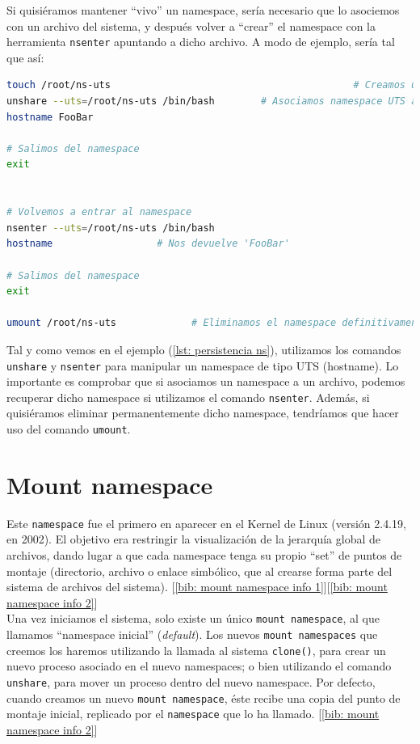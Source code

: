 \documentclass[a4paper, oneside, 12pt]{book}
\begin{document}
	\noindent Si quisiéramos mantener ``vivo'' un namespace, sería necesario que lo asociemos con un archivo del sistema, y después volver a ``crear'' el namespace con la herramienta \texttt{nsenter} apuntando a dicho archivo. A modo de ejemplo, sería tal que así:
	
	\begin{lstlisting}[language=Bash, label=lst: persistencia ns, caption=Ejemplo de un persistencia namespace]
touch /root/ns-uts											# Creamos un archivo
unshare --uts=/root/ns-uts /bin/bash		# Asociamos namespace UTS al archivo
hostname FooBar

# Salimos del namespace
exit
		
		
# Volvemos a entrar al namespace
nsenter --uts=/root/ns-uts /bin/bash
hostname                  # Nos devuelve 'FooBar'
		
# Salimos del namespace
exit
		
umount /root/ns-uts 			# Eliminamos el namespace definitivamente
	\end{lstlisting}
	
	\vspace{10px}
	
	\noindent Tal y como vemos en el ejemplo (\ref{lst: persistencia ns}), utilizamos los comandos \texttt{unshare} y \texttt{nsenter} para manipular un namespace de tipo UTS (hostname). Lo importante es comprobar que si asociamos un namespace a un archivo, podemos recuperar dicho namespace si utilizamos el comando \texttt{nsenter}. Además, si quisiéramos eliminar permanentemente dicho namespace, tendríamos que hacer uso del comando \texttt{umount}.
	
	\pagebreak
	
	\section{Mount namespace}
	\noindent Este \texttt{namespace} fue el primero en aparecer en el Kernel de Linux (versión 2.4.19, en 2002). El objetivo era restringir la visualización de la jerarquía global de archivos, dando lugar a que cada namespace tenga su propio ``set'' de puntos de montaje (directorio, archivo o enlace simbólico, que al crearse forma parte del sistema de archivos del sistema). [\ref{bib: mount namespace info 1}][\ref{bib: mount namespace info 2}] \\
	
	\noindent Una vez iniciamos el sistema, solo existe un único \texttt{mount namespace}, al que llamamos ``namespace inicial'' (\textit{default}). Los nuevos \texttt{mount namespaces} que creemos los haremos utilizando la llamada al sistema \texttt{clone()}, para crear un nuevo proceso asociado en el nuevo namespaces; o bien utilizando el comando \texttt{unshare}, para mover un proceso dentro del nuevo namespace. Por defecto, cuando creamos un nuevo \texttt{mount namespace}, éste recibe una copia del punto de montaje inicial, replicado por el \texttt{namespace} que lo ha llamado. [\ref{bib: mount namespace info 2}] \\
	
\end{document}
